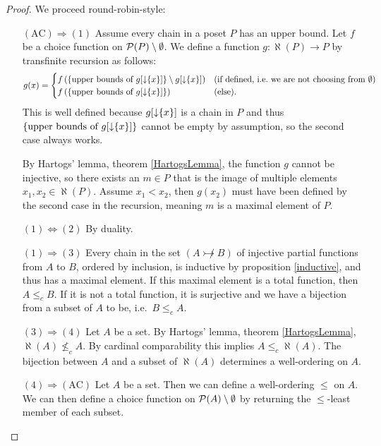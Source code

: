\begin{proof}
We proceed round-robin-style:
\begin{itemize}[leftmargin=2cm]
\item[$\boxed{(\text{AC}) \Rightarrow (1)}$] Assume every chain in a poset $P$ has an upper bound. Let $f$ be a choice function on $\operatorname{\mathcal{P}}(P)\setminus \emptyset$. We define a function $g: \aleph(P) \to P$ by transfinite recursion as follows:
\[ g(x) = \begin{cases}
f\left( \{\text{upper bounds of $g[\operatorname{\downarrow}\{x\}]$}  \} \setminus g[\operatorname{\downarrow}\{x\}] \right) & \text{(if defined, i.e.\ we are not choosing from $\emptyset$)} \\
f\left( \{\text{upper bounds of $g[\operatorname{\downarrow}\{x\}]$}  \} \right) & (\text{else}).
\end{cases} \]
This is well defined because $g[\operatorname{\downarrow}\{x\}]$ is a chain in $P$ and thus $\{\text{upper bounds of $g[\operatorname{\downarrow}\{x\}]$}  \}$ cannot be empty by assumption, so the second case always works.

By Hartogs' lemma, theorem \ref{HartogsLemma}, the function $g$ cannot be injective, so there exists an $m\in P$ that is the image of multiple elements $x_1,x_2\in\aleph(P)$. Assume $x_1 < x_2$, then $g(x_2)$ must have been defined by the second case in the recursion, meaning $m$ is a maximal element of $P$.
\item[$\boxed{(1) \Leftrightarrow (2)}$] By duality.
\item[$\boxed{(1) \Rightarrow (3)}$] Every chain in the set $(A \not\rightarrowtail B)$ of injective partial functions from $A$ to $B$, ordered by inclusion, is inductive by proposition \ref{inductive}, and thus has a maximal element. If this maximal element is a total function, then $A\leq_c B$. If it is not a total function, it is surjective and we have a bijection from a subset of $A$ to be, i.e.\ $B\leq_c A$.
\item[$\boxed{(3) \Rightarrow (4)}$] Let $A$ be a set. By Hartogs' lemma, theorem \ref{HartogsLemma}, $\aleph(A) \nleq_c A$. By cardinal comparability this implies $A \leq_c \aleph(A)$. The bijection between $A$ and a subset of $\aleph(A)$ determines a well-ordering on $A$.
\item[$\boxed{(4) \Rightarrow (\text{AC})}$] Let $A$ be a set. Then we can define a well-ordering $\leq$ on $A$. We can then define a choice function on $\operatorname{\mathcal{P}}(A)\setminus \emptyset$ by returning the $\leq$-least member of each subset.
\end{itemize}
\end{proof}

